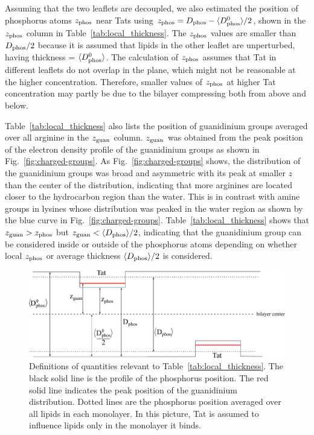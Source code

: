 Assuming that the two leaflets are decoupled, we also estimated the position
of phosphorus atoms $z_\textrm{phos}$ near Tats 
using $z_\textrm{phos} = D_\text{phos} - \langle D_\text{phos}^0\rangle/2$, shown in the $z_\textrm{phos}$ column
in Table~\ref{tab:local_thickness}. 
The $z_\textrm{phos}$ values are smaller than $D_\text{phos} /2$
because it is assumed that lipids in the other leaflet are unperturbed,
having thickness = $\langle D_\text{phos}^0\rangle$.
The calculation of $z_\textrm{phos}$ assumes that Tat in different leaflets do not
overlap in the plane, which might not be reasonable at the higher concentration.
Therefore, smaller values of $z_\textrm{phos}$ at higher Tat concentration
may partly be due to the bilayer compressing both from above and below.

Table~\ref{tab:local_thickness} also lists
the position of guanidinium groups averaged
over all arginine in the $z_\textrm{guan}$ column. $z_\textrm{guan}$ was obtained
from the peak position of the electron density profile of the guanidinium groups 
as shown in Fig.~\ref{fig:charged-groups}. As Fig.~\ref{fig:charged-groups} shows,
the distribution of the guanidinium groups was broad and 
asymmetric with its peak at smaller $z$ than the center
of the distribution, indicating that more arginines are located closer to the
hydrocarbon region than the water. This is in contrast with amine groups
in lysines whose distribution was peaked in the water region as shown by
the blue curve in Fig.~\ref{fig:charged-groups}.
Table~\ref{tab:local_thickness} shows that $z_\textrm{guan} > z_\textrm{phos}$ but
$z_\textrm{guan} < \langle D_\text{phos}\rangle/2$, indicating that the guanidinium group 
can be considered inside or outside of the phosphorus atoms depending on
whether local $z_\textrm{phos}$ or average thickness $\langle D_\text{phos}\rangle/2$ is considered.

\begin{figure}[htbp]
  \centering
  \includegraphics[width=\textwidth]{figures/Tat/MD_Results/dimensions}
  \caption{Definitions of quantities relevant to Table~\ref{tab:local_thickness}.
  The black solid line is the profile of the phosphorus position.
  The red solid line indicates the peak position of the guanidinium 
  distribution. Dotted lines are the phosphorus position averaged over all
  lipids in each monolayer. In this picture, Tat is assumed to influence
  lipids only in the monolayer it binds.}
  \label{fig:Dphos_dimensions}
\end{figure} 

